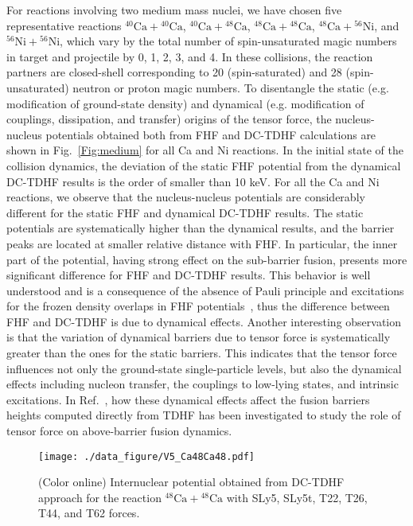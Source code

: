 \documentclass[aps,prc,twocolumn,showpacs,superscriptaddress,longbibliography,nofootinbib,floatfix,10pt]{revtex4-1}
\begin{document}
For reactions involving two medium mass nuclei, we have chosen five representative reactions $^{40}\mathrm{Ca}+\mathrm{^{40}Ca}$,
$^{40}\mathrm{Ca}+\mathrm{^{48}Ca}$, $^{48}\mathrm{Ca}+\mathrm{^{48}Ca}$, $^{48}\mathrm{Ca}+\mathrm{^{56}Ni}$, and $^{56}\mathrm{Ni}+\mathrm{^{56}Ni}$,
which vary by the total number of spin-unsaturated magic numbers in target and projectile by 0, 1, 2, 3, and 4.
In these collisions, the reaction partners are closed-shell corresponding to 20 (spin-saturated) and 28 (spin-unsaturated) neutron or proton magic numbers.
To disentangle the static (e.g. modification of ground-state density) and dynamical (e.g. modification of couplings, dissipation, and transfer) origins of the tensor
force, the nucleus-nucleus potentials obtained both from FHF and DC-TDHF calculations are shown in Fig.~\ref{Fig:medium} for all Ca and Ni reactions.
In the initial state of the collision dynamics, the deviation of the static FHF potential from the dynamical DC-TDHF results is the order of smaller than 10 keV.
For all the Ca and Ni reactions, we observe that the nucleus-nucleus potentials are considerably different for the static FHF and dynamical DC-TDHF results.
The static potentials are systematically higher than the dynamical results, and the barrier peaks are located at smaller relative distance with FHF. In particular,
the inner part of the potential, having strong effect on the sub-barrier fusion, presents more significant difference for FHF and DC-TDHF results.
This behavior is well understood and is a consequence of the absence of Pauli principle and excitations for the frozen density overlaps in FHF
potentials~\cite{Simenel2013_PRC88-064604,Guo2018_PLB782-401,Simenel2017_PRC95-031601}, thus the difference between FHF and DC-TDHF is due to dynamical effects.
Another interesting observation is that the variation of dynamical barriers due to tensor force is systematically greater than the
ones for the static barriers.
This indicates that the tensor force influences not only
the ground-state single-particle levels, but also the dynamical effects including nucleon transfer, the couplings to low-lying states, and intrinsic
excitations.
In Ref.~\cite{Guo2018_PLB782-401}, how these dynamical effects affect the fusion barriers heights computed directly from TDHF has been investigated to study the
role of tensor force on above-barrier fusion dynamics.
\begin{figure}[t]
\texttt{[image: ./data\_figure/V5\_Ca48Ca48.pdf]}
\caption{(Color online) Internuclear potential obtained from DC-TDHF approach for the reaction $^{48}\mathrm{Ca}+\mathrm{^{48}Ca}$ with SLy5, SLy5t,
T22, T26, T44, and T62 forces.
\label{Fig:TIJ}}
\end{figure}
\end{document}
